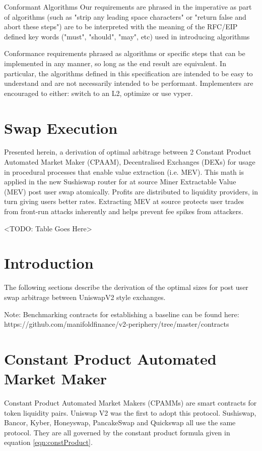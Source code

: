 \documentclass[runningheads]{llncs}
\begin{document}
Conformant Algorithms
Our requirements are phrased in the imperative as part of algorithms (such as "strip any leading space characters" or "return false and abort these steps") are to be interpreted with the meaning of the RFC/EIP defined key words ("must", "should", "may", etc) used in introducing algorithms

\hfill \break

Conformance requirements phrased as algorithms or specific steps that can be implemented in any manner, so long as the end result are equivalent. In particular, the algorithms defined in this specification are intended to be easy to understand and are not necessarily intended to be performant. Implementers are encouraged to either: switch to an L2, optimize or use vyper.



\section{Swap Execution}
	

		Presented herein, a derivation of optimal arbitrage between 2 Constant Product Automated Market Maker (CPAAM), Decentralised Exchanges (DEXs) for usage in procedural processes that enable value extraction (i.e. MEV).
		 This math is applied in the new Sushiswap router for at source Miner Extractable Value (MEV) post user swap atomically. 
		Profits are distributed to liquidity providers, in turn giving users better rates. Extracting MEV at source protects user trades from front-run attacks inherently and helps prevent fee spikes from attackers.

<TODO: Table Goes Here>


	\newpage
	
	\section{Introduction}


    
	
	The following sections describe the derivation of the optimal sizes for post user swap arbitrage between UniswapV2 style exchanges.
	
	Note: Benchmarking contracts for establishing a baseline can be found here: https://github.com/manifoldfinance/v2-periphery/tree/master/contracts
	
	

	
	\section{Constant Product Automated Market Maker}
	Constant Product Automated Market Makers (CPAMMs) are smart contracts for token liquidity pairs. Uniswap V2 was the first to adopt this protocol. Sushiswap, Bancor, Kyber, Honeyswap, PancakeSwap and Quickswap all use the same protocol. They are all governed by the constant product formula given in equation \ref{eqn:constProduct}. 
	
\end{document}
